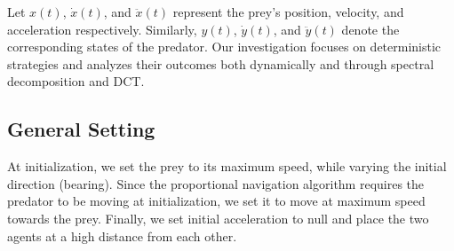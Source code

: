 \documentclass[11pt]{article}
\begin{document}
  Let $x(t)$, $\dot{x}(t)$, and $\ddot{x}(t)$ represent the prey’s position, velocity, and acceleration respectively. Similarly, $y(t)$, $\dot{y}(t)$, and $\ddot{y}(t)$ denote the corresponding states of the predator. Our investigation focuses on deterministic strategies and analyzes their outcomes both dynamically and through spectral decomposition and DCT.

  \subsection{General Setting}
  At initialization, we set the prey to its maximum speed, while varying the initial direction (bearing). Since the proportional navigation algorithm requires the predator to be moving at initialization, we set it to move at maximum speed towards the prey. Finally, we set initial acceleration to null and place the two agents at a high distance from each other.
\end{document}
